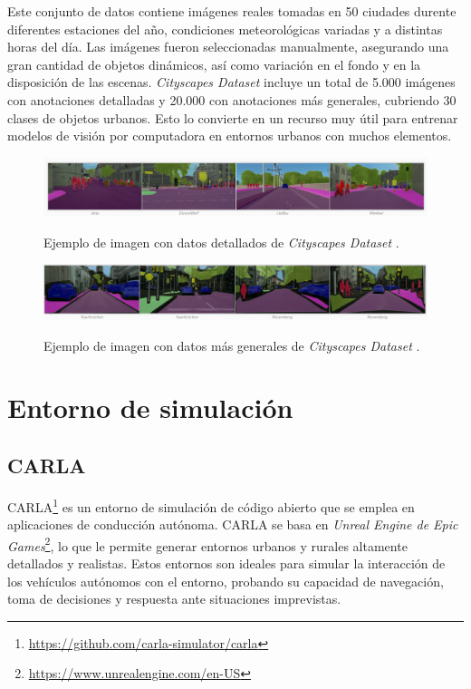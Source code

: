 Este conjunto de datos contiene imágenes reales tomadas en 50 ciudades durente diferentes estaciones del año, condiciones meteorológicas variadas y a distintas horas del día. Las imágenes fueron seleccionadas manualmente, asegurando una gran cantidad de objetos dinámicos, así como variación en el fondo y en la disposición de las escenas. \textit{Cityscapes Dataset} incluye un total de 5.000 imágenes con anotaciones detalladas y 20.000 con anotaciones más generales, cubriendo 30 clases de objetos urbanos. Esto lo convierte en un recurso muy útil para entrenar modelos de visión por computadora en entornos urbanos con muchos elementos.
\begin{figure}[ht]
\begin{center}
\includegraphics[width=15cm]{figs/Plataformas_Desarollo/detallado-ef.png}
\caption{Ejemplo de imagen con datos detallados de \textit{Cityscapes Dataset} \cite{cityscapes}.}
\label{foto_ef_detallado}
\vspace{0.5cm} %
\includegraphics[width=15cm]{figs/Plataformas_Desarollo/no_detallado_ef.png}
\caption{Ejemplo de imagen con datos más generales de \textit{Cityscapes Dataset} \cite{cityscapes}.}
\label{foto_ef_general}
\end{center}
\end{figure}

\section{Entorno de simulación}
\label{sec:sim}
\subsection{CARLA}
\label{sec:carla}

CARLA\footnote{\url{https://github.com/carla-simulator/carla}} es un entorno de simulación de código abierto que se emplea en aplicaciones de conducción autónoma. CARLA se basa en \textit{Unreal Engine de Epic Games}\footnote{\url{https://www.unrealengine.com/en-US}}, lo que le permite generar entornos urbanos y rurales altamente detallados y realistas. Estos entornos son ideales para simular la interacción de los vehículos autónomos con el entorno, probando su capacidad de navegación, toma de decisiones y respuesta ante situaciones imprevistas.

